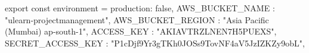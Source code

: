 export const environment = {
  production: false,
  AWS_BUCKET_NAME : "ulearn-projectmanagement",
  AWS_BUCKET_REGION : "Asia Pacific (Mumbai) ap-south-1",
  ACCESS_KEY : "AKIAVTRZLNEN7H5PUEXS",
  SECRET_ACCESS_KEY : "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",
 }
  
